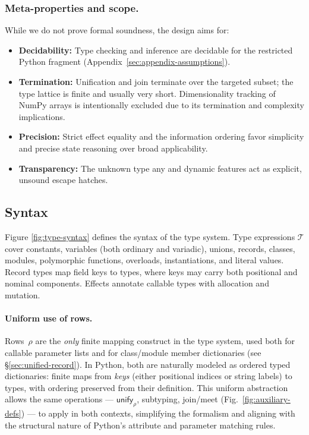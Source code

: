 \subsubsection*{Meta-properties and scope.}
While we do not prove formal soundness, the design aims for:
\begin{itemize}
  \item \textbf{Decidability:} Type checking and inference are decidable for the restricted Python fragment (Appendix~\ref{sec:appendix-assumptions}).
  \item \textbf{Termination:} Unification and join terminate over the targeted subset; the type lattice is finite and usually very short. Dimensionality tracking of NumPy arrays is intentionally excluded due to its termination and complexity implications.
  \item \textbf{Precision:} Strict effect equality and the information ordering favor simplicity and precise state reasoning over broad applicability.
  \item \textbf{Transparency:} The unknown type \textsf{any} and dynamic features act as explicit, unsound escape hatches.
\end{itemize}

\subsection{Syntax}
Figure \ref{fig:type-syntax} defines the syntax of the type system. Type expressions $\mathcal{T}$ cover constants, variables (both ordinary and variadic), unions, records, classes, modules, polymorphic functions, overloads, instantiations, and literal values.  
Record types map field keys to types, where keys may carry both positional and nominal components.  
Effects annotate callable types with allocation and mutation.

\paragraph{Uniform use of rows.}
Rows~$\rho$ are the \emph{only} finite mapping construct in the type system, used both for
callable parameter lists and for class/module member dictionaries (see §\ref{sec:unified-record}).  
In Python, both are naturally modeled as ordered typed dictionaries: finite maps from
\emph{keys} (either positional indices or string labels) to types, with ordering
preserved from their definition.  
This uniform abstraction allows the same operations --- $\mathsf{unify}_{\rho}$, subtyping, join/meet (Fig.~\ref{fig:auxiliary-defs}) --- to apply in both contexts,  
simplifying the formalism and aligning with the structural nature of Python's
attribute and parameter matching rules.

